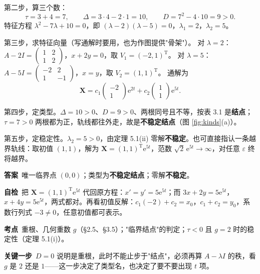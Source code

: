 \documentclass[11pt]{ctexart}
\renewcommand{\qbreak}{\needspace{0.26\textheight}}
\newcommand{\qpagebreak}{\needspace{0.92\textheight}}
\newcommand{\X}{\mathbf{X}}\newcommand{\Y}{\mathbf{Y}}
\newcommand{\eps}{\varepsilon}
\begin{document}
第二步，算三个数：
\[
\tau=3+4=7,\qquad \Delta=3\cdot4-2\cdot1=10,\qquad D=7^{2}-4\cdot10=9>0 .
\]
特征方程 $\lambda^{2}-7\lambda+10=0$，即 $(\lambda-2)(\lambda-5)=0$，$\lambda_1=2$，$\lambda_2=5$。

第三步，求特征向量（写通解时要用，也为作图提供"骨架"）。
对 $\lambda=2$：$A-2I=\begin{pmatrix}1&2\\1&2\end{pmatrix}$，$x+2y=0$，取 $V_1=(-2,1)^{\mathrm T}$。
对 $\lambda=5$：$A-5I=\begin{pmatrix}-2&2\\1&-1\end{pmatrix}$，$x=y$，取 $V_2=(1,1)^{\mathrm T}$。
通解为
\[
\X=c_1\begin{pmatrix}-2\\1\end{pmatrix}\mathrm{e}^{2t}+c_2\begin{pmatrix}1\\1\end{pmatrix}\mathrm{e}^{5t}.
\]

第四步，定类型。$\Delta=10>0$、$D=9>0$、两根同号且不等，按表 3.1 是\textbf{结点}；$\tau=7>0$ 两根都为正，轨线都往外走，故是\textbf{不稳定结点}（图 \ref{fig:kinds}(a)）。

第五步，定稳定性。$\lambda_2=5>0$，由定理 5.1(ii) 零解\textbf{不稳定}。也可直接指认一条越界轨线：取初值 $(1,1)$，解为 $\X=(1,1)^{\mathrm T}\mathrm{e}^{5t}$，范数 $\sqrt2\,\mathrm{e}^{5t}\to\infty$，对任意 $\eps$ 终将越界。

\textbf{答案}\ 唯一临界点 $(0,0)$；类型为\textbf{不稳定结点}；零解\textbf{不稳定}。

\textbf{自检}\ 把 $\X=(1,1)^{\mathrm T}\mathrm{e}^{5t}$ 代回原方程：$x'=y'=5\mathrm{e}^{5t}$；而 $3x+2y=5\mathrm{e}^{5t}$，$x+4y=5\mathrm{e}^{5t}$，两式都对。再看初值反解：$c_1(-2)+c_2=x_0$，$c_1+c_2=y_0$，系数行列式 $-3\neq0$，任意初值都可表示。

\qpagebreak
\qbreak
{}
\label{app:a2}

\textbf{考点}\ 重根、几何重数 $g$（§2.5、§3.5）；"临界结点"的判定；$\tau<0$ 且 $g=2$ 时的稳定性（定理 5.1(i)）。

\textbf{关键一步}\ $D=0$ 说明是重根，此时不能止步于"结点"，必须再算 $A-\lambda I$ 的秩，看 $g$ 是 $2$ 还是 $1$——这一步决定了类型名，也决定了要不要出现 $t$ 项。
\end{document}
